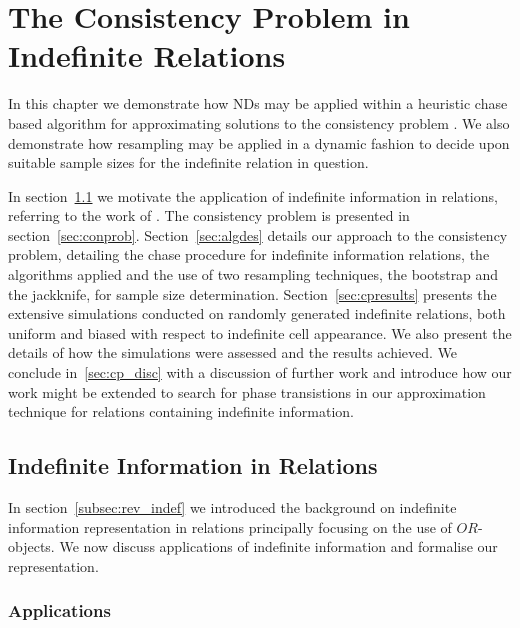 \chapter{The Consistency Problem in Indefinite Relations}\label{chap:consistency}

In this chapter we demonstrate how NDs may be applied within a
heuristic chase based algorithm for approximating solutions to the
consistency problem \cite{vn95}. We also demonstrate how resampling
may be applied in a dynamic fashion to decide upon suitable sample
sizes for the indefinite relation in question.

\medskip

In section~\ref{sec:intro} we motivate the application of indefinite
information in relations, referring to the work of
\cite{vn95,inv91,ivv95}. The consistency problem is presented in
section~\ref{sec:conprob}. Section~\ref{sec:algdes} details our
approach to the consistency problem, detailing the chase procedure for
indefinite information relations, the algorithms applied and the use
of two resampling techniques, the bootstrap and the jackknife, for
sample size determination. Section~\ref{sec:cpresults} presents the
extensive simulations conducted on randomly generated indefinite
relations, both uniform and biased with respect to indefinite cell
appearance. We also present the details of how the simulations were
assessed and the results achieved. We conclude in~\ref{sec:cp_disc}
with a discussion of further work and introduce how our work might be
extended to search for phase transistions in our approximation
technique for relations containing indefinite information.

\section{Indefinite Information in Relations}\label{sec:intro}

In section~\ref{subsec:rev_indef} we introduced the background on
indefinite information representation in relations principally
focusing on the use of $OR$-objects. We now discuss applications of
indefinite information and formalise our representation.

\subsection{Applications}
		
